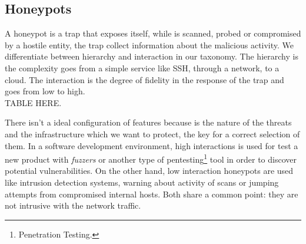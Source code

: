 \documentclass[a4paper]{llncs}
\begin{document}
\subsection{Honeypots}
A honeypot is a trap that exposes itself, while is scanned, probed or compromised by a hostile entity, the trap collect information about the malicious activity. We differentiate between hierarchy and interaction in our taxonomy. The hierarchy is the complexity goes from a simple service like SSH, through a network, to a cloud. The interaction is the degree of fidelity in the response of the trap and goes from low to high.\\
TABLE HERE.

There isn't a ideal configuration of features because 
is the nature of the threats and the infrastructure which we want to protect, the key for a correct selection of them.
 In a software development environment, high interactions is used for 
 test a new product with {\it fuzzers} or another type of pentesting\footnote{Penetration Testing.}
  tool in order to discover potential vulnerabilities. On the other hand, low interaction honeypots are used like intrusion detection systems, warning about activity of scans or jumping attempts from compromised internal hosts. Both share a common point: they are not intrusive with the network traffic.

\end{document}
